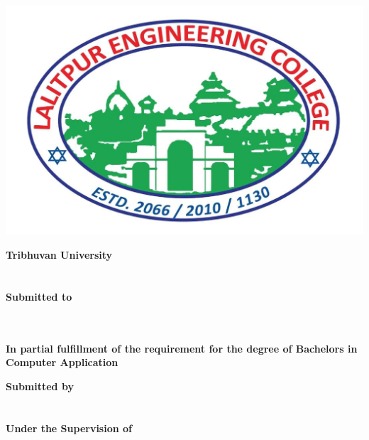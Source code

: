 \begin{center}
\begin{spacing}{1.6}
\thispagestyle{empty}

\includegraphics[scale=0.18]{img/Graphics/lec.jpg}

\textbf{
\large{Tribhuvan University}\\
\large{\theinstitute}}\\
\vspace{0.5cm}
\textbf{\MakeUppercase{\thetitle}\\
\vspace{0.5cm} 
Submitted to\\ 
\thedepartment\\
\thecampus}\\
\vspace{0.5cm}

\textbf{In partial fulfillment of the requirement for the degree of Bachelors in Computer Application}
\bigskip

\par

\textbf{
Submitted by\\
\theauthor\\
\MakeUppercase{\thedate}}\\
\vspace{1cm}
\textbf{
Under the Supervision of\\
\thesupervisor
}
\end{spacing}
\end{center}

\clearpage